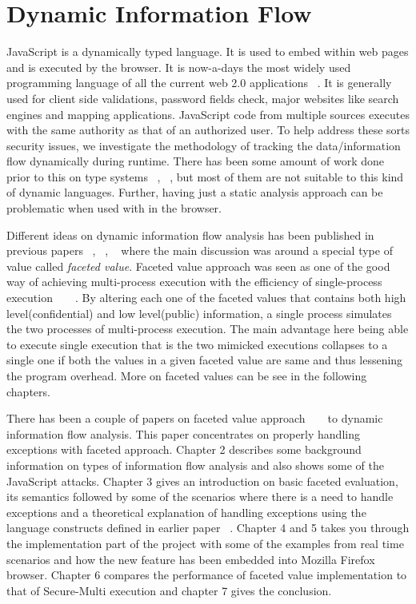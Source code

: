 \section{Dynamic Information Flow}

JavaScript is a dynamically typed language. It is used to embed within web pages and is executed by the browser.  It is now-a-days the most widely used programming language of all the current web 2.0 applications ~\cite{JavaScript}. It is generally used for client side validations, password fields check, major websites like search engines and mapping applications. JavaScript code from multiple sources executes with the same authority as that of an authorized user. To help address these sorts security issues, we investigate the methodology of tracking the data/information flow dynamically during runtime. There has been some amount of work done prior to this on type systems ~\cite{Javastatic1}, ~\cite{Javastatic3}, but most of them are not suitable to this kind of dynamic languages. Further, having just a static analysis approach can be problematic when used with in the browser.

Different ideas on dynamic information flow analysis has been published in previous papers ~\cite{harden}, ~\cite{basa}, ~\cite{bib3} where the main discussion was around a special type of value called {\it faceted value}. Faceted value approach was seen as one of the good way of achieving multi-process execution with the efficiency of single-process execution ~\cite{multiproc2} ~\cite{multiproc1} . By altering each one of the faceted values that contains both high level(confidential) and low level(public) information, a single process simulates the two processes of multi-process execution. The main advantage here being able to execute single execution that is the two mimicked executions collapses to a single one if both the values in a given faceted value are same and thus lessening the program overhead. More on faceted values can be see in the following chapters.

There has been a couple of papers on faceted value approach  ~\cite{bib4} ~\cite{bib3} to dynamic information flow analysis. This paper concentrates on properly handling exceptions with faceted approach. Chapter 2 describes some background information on types of information flow analysis and also shows some of the JavaScript attacks. Chapter 3 gives an introduction on basic faceted evaluation, its semantics followed by some of the scenarios where there is a need to handle exceptions and a theoretical explanation of handling exceptions using the language constructs defined in earlier paper ~\cite{bib4}. Chapter 4 and 5 takes you through the implementation part of the project with some of the examples from real time scenarios and how the  new feature has been embedded into Mozilla Firefox browser. Chapter 6 compares the performance of faceted value implementation to that of Secure-Multi execution and chapter 7 gives the conclusion.